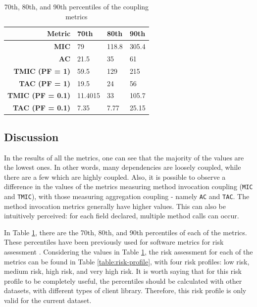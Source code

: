 \begin{table}[ht!]
    \begin{center}
    \begin{tabular}{|r|l|l|l|}
    \hline
    \textbf{Metric} & \textbf{70th} & \textbf{80th} & \textbf{90th} \\ \hline\hline
    \textbf{MIC} & 79 & 118.8 & 305.4 \\ \hline
    \textbf{AC} & 21.5 & 35 & 61 \\ \hline
    \textbf{TMIC (PF = 1)} & 59.5 & 129 & 215 \\ \hline
    \textbf{TAC (PF = 1)} & 19.5 & 24 & 56 \\ \hline
    \textbf{TMIC (PF = 0.1)} & 11.4015 & 33 & 105.7 \\ \hline
    \textbf{TAC (PF = 0.1)} & 7.35 & 7.77 & 25.15 \\ \hline
    \end{tabular}
    \end{center}
    \caption{70th, 80th, and 90th percentiles of the coupling metrics}
    \label{table:percentiles}
\end{table}


\subsection{Discussion}

In the results of all the metrics, one can see that the majority of the values are the lowest ones. In other words, many dependencies are loosely coupled, while there are a few which are highly coupled. Also, it is possible to observe a difference in the values of the metrics measuring method invocation coupling (\texttt{MIC} and \texttt{TMIC}), with those measuring aggregation coupling - namely \texttt{AC} and \texttt{TAC}. The method invocation metrics generally have higher values. This can also be intuitively perceived: for each field declared, multiple method calls can occur.

In Table \ref{table:percentiles}, there are the 70th, 80th, and 90th percentiles of each of the metrics. These percentiles have been previously used for software metrics for risk assessment \cite{alves2010deriving}. Considering the values in Table \ref{table:percentiles}, the risk assessment for each of the metrics can be found in Table \ref{table:risk-profile}, with four risk profiles: low risk, medium risk, high risk, and very high risk. It is worth saying that for this risk profile to be completely useful, the percentiles should be calculated with other datasets, with different types of client library. Therefore, this risk profile is only valid for the current dataset.


